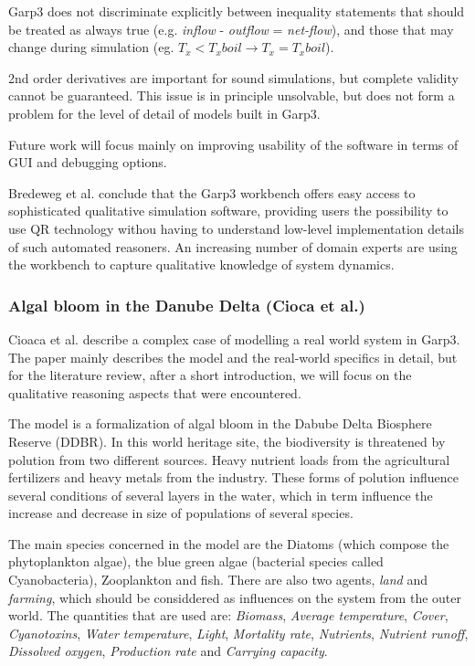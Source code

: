 \documentclass{article} %
\begin{document}
Garp3 does not discriminate explicitly between inequality statements that
should be treated as always true (e.g. \emph{inflow} - \emph{outflow} = 
\emph{net-flow}), and those that may change during simulation 
(eg. $T_x < T_xboil \rightarrow T_x = T_xboil$).

\vspace{0.8em}

2nd order derivatives are important for sound simulations, but complete
validity cannot be guaranteed. This issue is in principle unsolvable, but does
not form a problem for the level of detail of models built in Garp3.  

Future work will focus mainly on improving usability of the software in terms
of GUI and debugging options.

Bredeweg et al. conclude that the Garp3 workbench offers easy access to 
sophisticated qualitative simulation software, providing users the 
possibility to use QR technology withou having to understand low-level 
implementation details of such automated reasoners. An increasing number of 
domain experts are using the workbench to capture qualitative knowledge of 
system dynamics.  

\subsubsection{Algal bloom in the Danube Delta (Cioca et al.)}

Cioaca et al. describe a complex case of modelling a real world system in Garp3.
The paper mainly describes the model and the real-world specifics in detail, but 
for the literature review, after a short introduction, we will focus on the 
qualitative reasoning aspects that were encountered.

\vspace{0.8em}

The model is a formalization of algal bloom in the Dabube Delta Biosphere
Reserve (DDBR). In this world heritage site, the biodiversity is threatened by
polution from two different sources. Heavy nutrient loads from the agricultural 
fertilizers and heavy metals from the industry. These forms of polution
influence several conditions of several layers in the water, which in term
influence the increase and decrease in size of populations of several species.

The main species concerned in the model are the Diatoms (which compose the
phytoplankton algae), the blue green algae (bacterial species called
Cyanobacteria), Zooplankton and fish. There are also two agents, \emph{land} and
\emph{farming}, which should be considdered as influences on the system from the
outer world. The quantities that are used are: \emph{Biomass}, \emph{Average
temperature}, \emph{Cover}, \emph{Cyanotoxins}, \emph{Water temperature},
\emph{Light}, \emph{Mortality rate}, \emph{Nutrients}, \emph{Nutrient runoff},
\emph{Dissolved oxygen}, \emph{Production rate} and \emph{Carrying capacity}.
\end{document}
